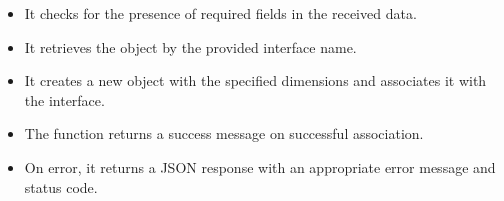 \documentclass[letterpaper,10pt,english]{sphinxmanual}
\begin{document}
\begin{fulllineitems}
\begin{description}
\begin{itemize}
\item {} 
\sphinxAtStartPar
It checks for the presence of required fields in the received data.

\item {} 
\sphinxAtStartPar
It retrieves the  object by the provided interface name.

\item {} 
\sphinxAtStartPar
It creates a new  object with the specified dimensions and associates it with the interface.

\item {} 
\sphinxAtStartPar
The function returns a success message on successful association.

\item {} 
\sphinxAtStartPar
On error, it returns a JSON response with an appropriate error message and status code.

\end{itemize}

\end{description}

\end{fulllineitems}

\end{document}
